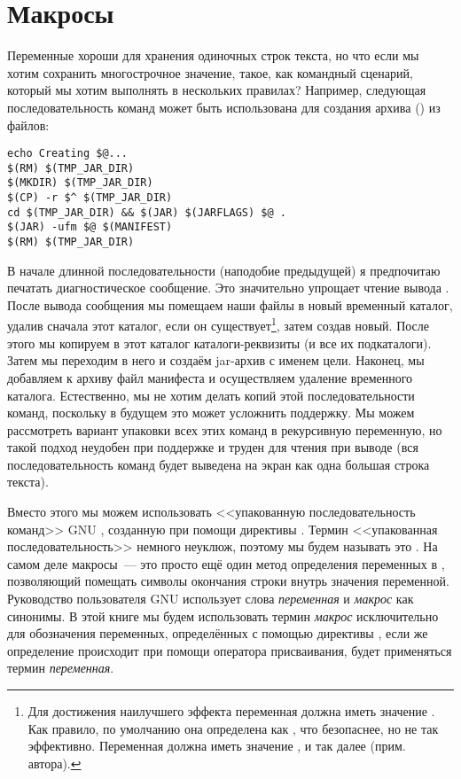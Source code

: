 \section{Макросы}

Переменные хороши для хранения одиночных строк текста, но что если мы
хотим сохранить многострочное значение, такое, как командный сценарий,
который мы хотим выполнять в нескольких правилах? Например, следующая
последовательность команд может быть использована для создания \Java{}
архива () из  файлов:

{\footnotesize
\begin{verbatim}
echo Creating $@...
$(RM) $(TMP_JAR_DIR)
$(MKDIR) $(TMP_JAR_DIR)
$(CP) -r $^ $(TMP_JAR_DIR)
cd $(TMP_JAR_DIR) && $(JAR) $(JARFLAGS) $@ .
$(JAR) -ufm $@ $(MANIFEST)
$(RM) $(TMP_JAR_DIR)
\end{verbatim}
}

В начале длинной последовательности (наподобие предыдущей) я
предпочитаю печатать диагностическое сообщение. Это значительно
упрощает чтение вывода \GNUmake{}. После вывода сообщения мы помещаем
наши  файлы в новый временный каталог, удалив сначала
этот каталог, если он существует\footnote{%
Для достижения наилучшего эффекта переменная  должна
иметь значение . Как правило, по умолчанию она
определена как , что безопаснее, но не так эффективно.
Переменная  должна иметь значение , и
так далее (прим. автора).}, затем создав новый. После этого мы
копируем в этот каталог каталоги\hyp{}реквизиты (и все их
подкаталоги). Затем мы переходим в него и создаём jar\hyp{}архив с
именем цели. Наконец, мы добавляем к архиву файл манифеста и
осуществляем удаление временного каталога. Естественно, мы не хотим
делать копий этой последовательности команд, поскольку в будущем это
может усложнить поддержку. Мы можем рассмотреть вариант
упаковки всех этих команд в рекурсивную переменную, но такой подход
неудобен при поддержке и труден для чтения при выводе \GNUmake{} (вся
последовательность команд будет выведена на экран как одна большая
строка текста).

Вместо этого мы можем использовать <<упакованную последовательность
команд>> GNU \GNUmake{}, созданную при помощи директивы
.  Термин <<упакованная последовательность>> немного
неуклюж, поэтому мы будем называть это . На самом
деле макросы~--- это просто ещё один метод определения переменных в
\GNUmake{}, позволяющий помещать символы окончания строки внутрь
значения переменной. Руководство пользователя GNU \GNUmake{}
использует слова \emph{переменная} и \emph{макрос} как синонимы. В
этой книге мы будем использовать термин \emph{макрос} исключительно
для обозначения переменных, определённых с помощью директивы
, если же определение происходит при помощи
оператора присваивания, будет применяться термин \emph{переменная}.

